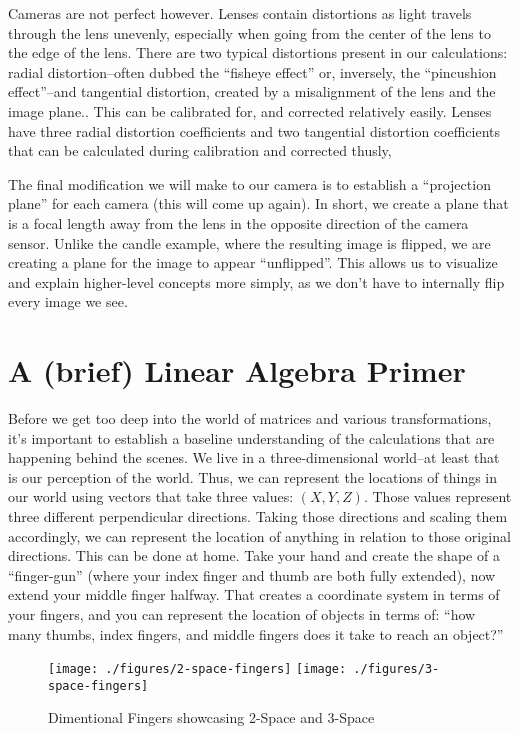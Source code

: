 \documentclass[12pt,twoside]{reedthesis}
\begin{document}
Cameras are not perfect however. Lenses contain distortions as light travels through the lens unevenly, especially when going from the center of the lens to the edge of the lens. There are two typical distortions present in our calculations: radial distortion–often dubbed the “fisheye effect” or, inversely, the “pincushion effect”--and tangential distortion, created by a misalignment of the lens and the image plane.. This can be calibrated for, and corrected relatively easily. Lenses have three radial distortion coefficients and two tangential distortion coefficients that can be calculated during calibration and corrected thusly, 

The final modification we will make to our camera is to establish a “projection plane” for each camera (this will come up again). In short, we create a plane that is a focal length away from the lens in the opposite direction of the camera sensor. Unlike the candle example, where the resulting image is flipped, we are creating a plane for the image to appear “unflipped”. This allows us to visualize and explain higher-level concepts more simply, as we don’t have to internally flip every image we see.

\section{A (brief) Linear Algebra Primer}
Before we get too deep into the world of matrices and various transformations, it’s important to establish a baseline understanding of the calculations that are happening behind the scenes. We live in a three-dimensional world–at least that is our perception of the world. Thus, we can represent the locations of things in our world using vectors that take three values: $(X, Y, Z)$. Those values represent three different perpendicular directions. Taking those directions and scaling them accordingly, we can represent the location of anything in relation to those original directions. This can be done at home. Take your hand and create the shape of a “finger-gun” (where your index finger and thumb are both fully extended), now extend your middle finger halfway. That creates a coordinate system in terms of your fingers, and you can represent the location of objects in terms of: “how many thumbs, index fingers, and middle fingers does it take to reach an object?”

\begin{figure}[h]
	   
	       \centering
	    
	    \texttt{[image: ./figures/2-space-fingers]} 
		\hfill	    
	    \texttt{[image: ./figures/3-space-fingers]}
	     \caption{Dimentional Fingers showcasing 2-Space and 3-Space}
	 \label{Dimentional Fingers}
	\end{figure}
\end{document}
